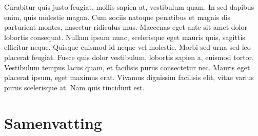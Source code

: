 Curabitur quis justo feugiat, mollis sapien at, vestibulum quam. In sed dapibus enim, quis molestie magna. Cum sociis natoque penatibus et magnis dis parturient montes, nascetur ridiculus mus. Maecenas eget ante sit amet dolor lobortis consequat. Nullam ipsum nunc, scelerisque eget mauris quis, sagittis efficitur neque. Quisque euismod id neque vel molestie. Morbi sed urna sed leo placerat feugiat. Fusce quis dolor vestibulum, lobortis sapien a, euismod tortor. Vestibulum tempus lacus quam, et facilisis purus consectetur nec. Mauris eget placerat ipsum, eget maximus erat. Vivamus dignissim facilisis elit, vitae varius purus scelerisque at. Nam quis tincidunt est.



\chapter*{Samenvatting}

